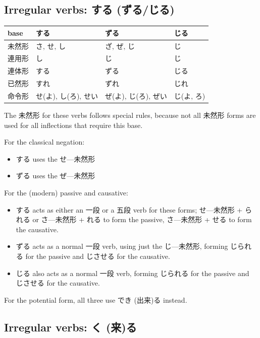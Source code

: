 \documentclass[11pt, b5paper, twoside, openright, onecolumn]{book}
\makeatletter
\newcommand*{\rubystack}[2]{{\relscale{0.5}%
  \begin{tabular}[b]{@{}c@{}}%
    {#1}\\%
   {\textscale{2}{#2}}%
  \end{tabular}}%
}
\DeclareRobustCommand*{\ruby}[2]{%
  \mbox{%
    \setlength{\parskip}{0ex}%
    \BeginAccSupp{method=pdfstringdef,ActualText={#1}}%
      \rubystack{\phantom{#2}}{#1}%
      \llap{%
        \rubystack{#2}{\phantom{#1}}%
      }%
    \EndAccSupp{}%
  }%
}
\renewcommand*{\ruby}[2]{#2 (#1)}%
\newenvironment{mytabular}[1]{\noindent\hspace{0.4in}
\begin{tabular}[h]{#1}}{\end{tabular}}
\makeatother
\begin{document}
\subsection{Irregular verbs: する (ずる/じる)}

\smaller
\begin{mytabular}{| l  l  l  l |}\hline 
\rule{0pt}{2.4ex}base & する & ずる & じる\\ 
\hline
\rule{0pt}{2.4ex}未然形 & さ‚ せ‚ し & ざ‚ ぜ‚ じ & じ\\ 
\rule{0pt}{2.4ex}連用形 & し & じ & じ\\ 
\rule{0pt}{2.4ex}連体形 & する & ずる & じる\\ 
\rule{0pt}{2.4ex}已然形 & すれ & ずれ & じれ\\ 
\rule{0pt}{2.4ex}命令形 & せ(よ)‚ し(ろ)‚ せい & ぜ(よ)‚ じ(ろ)‚ ぜい & じ(よ‚ ろ)\\ 
\hline 
\end{mytabular}
\larger
\vspace{0.5cm}


The 未然形 for these verbs follows special rules‚ because not all 未然形 forms are used for all inflections that require this base.

For the classical negation:

\begin{itemize}
\item する uses the せ—未然形
\item ずる uses the ぜ—未然形
\end{itemize}

For the (modern) passive and causative:

\begin{itemize}
\item する acts as either an 一段 or a 五段 verb for these forms; せ—未然形 + られる or さ—未然形 + れる to form the passive‚ さ—未然形 + せる to form the causative.
\item ずる acts as a normal 一段 verb‚ using just the じ—未然形‚ forming じられる for the passive and じさせる for the causative.
\item じる also acts as a normal 一段 verb‚ forming じられる for the passive and じさせる for the causative.
\end{itemize}
  
For the potential form‚ all three use \ruby{出来}{でき}る instead.


\subsection{Irregular verbs: \ruby{来}{く}る}
\end{document}
